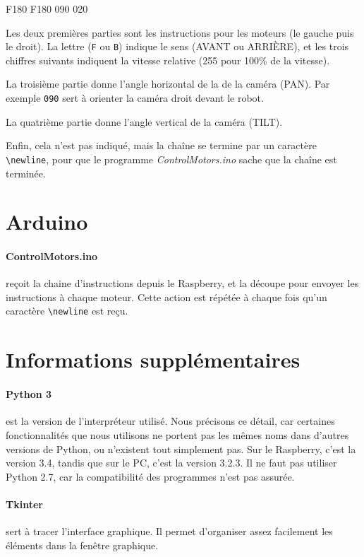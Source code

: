 \documentclass[12pt,a4paper]{report}
\begin{document}
\begin{verbatimtab}[3]
F180 F180 090 020
\end{verbatimtab}

Les deux premières parties sont les instructions pour les moteurs (le gauche puis le droit). La lettre (\verb=F= ou \verb=B=) indique le sens (AVANT ou ARRIÈRE), et les trois chiffres suivants indiquent la vitesse relative (255 pour 100\% de la vitesse).

La troisième partie donne l'angle horizontal de la de la caméra (PAN). Par exemple \verb=090= sert à orienter la caméra droit devant le robot.

La quatrième partie donne l'angle vertical de la caméra (TILT).

Enfin, cela n'est pas indiqué, mais la chaîne se termine par un caractère \verb=\newline=, pour que le programme \textit{ControlMotors.ino} sache que la chaîne est terminée. 

\section{Arduino}

\paragraph{ControlMotors.ino} reçoit la chaine d'instructions depuis le Raspberry, et la découpe pour envoyer les instructions à chaque moteur. Cette action est répétée à chaque fois qu'un caractère \verb=\newline= est reçu.

\section{Informations supplémentaires}

\paragraph{Python 3} est la version de l'interpréteur utilisé. Nous précisons ce détail, car certaines fonctionnalités que nous utilisons ne portent pas les mêmes noms dans d'autres versions de Python, ou n'existent tout simplement pas. Sur le Raspberry, c'est la version 3.4, tandis que sur le PC, c'est la version 3.2.3. Il ne faut pas utiliser Python 2.7, car la compatibilité des programmes n'est pas assurée.

\paragraph{Tkinter} sert à tracer l'interface graphique. Il permet d'organiser assez facilement les éléments dans la fenêtre graphique.
\end{document}
